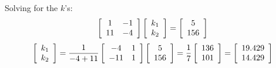 Solving for the $k$'s:
\[
\left[ {\begin{array}{*{20}c}
   1 & { - 1}  \\
   {11} & { - 4}  \\
\end{array}} \right]\left[ {\begin{array}{*{20}c}
   {k_1 }  \\
   {k_2 }  \\
\end{array}} \right] = \left[ {\begin{array}{*{20}c}
   5  \\
   {156}  \\
\end{array}} \right]
\]
\[
\left[ {\begin{array}{*{20}c}
   {k_1 }  \\
   {k_2 }  \\
\end{array}} \right] = \frac{1}{{ - 4 + 11}}\left[ {\begin{array}{*{20}c}
   { - 4} & 1  \\
   { - 11} & 1  \\
\end{array}} \right]\left[ {\begin{array}{*{20}c}
   5  \\
   {156}  \\
\end{array}} \right] = \frac{1}{7}\left[ {\begin{array}{*{20}c}
   {136}  \\
   {101}  \\
\end{array}} \right] = \left[ {\begin{array}{*{20}c}
   {19.429}  \\
   {14.429}  \\
\end{array}} \right]
\]

